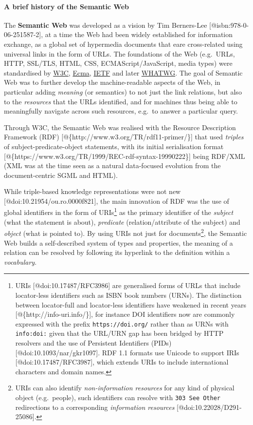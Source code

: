 \hypertarget{sec:semweb}{%
\paragraph{A brief history of the Semantic Web}\label{sec:semweb}}

The \textbf{Semantic Web} was developed as a vision by Tim Berners-Lee
{[}@isbn:978-0-06-251587-2{]}, at a time the Web had been widely
established for information exchange, as a global set of hypermedia
documents that eare cross-related using universal links in the form of
URLs. The foundations of the Web (e.g.~URLs, HTTP, SSL/TLS, HTML, CSS,
ECMAScript/JavaScript, media types) were standardised by
\href{https://www.w3.org/standards/}{W3C},
\href{https://www.ecma-international.org/}{Ecma},
\href{https://www.ietf.org/standards/}{IETF} and later
\href{https://whatwg.org/}{WHATWG}. The goal of Semantic Web was to
further develop the machine-readable aspects of the Web, in particular
adding \emph{meaning} (or semantics) to not just the link relations, but
also to the \emph{resources} that the URLs identified, and for machines
thus being able to meaningfully navigate across such resources, e.g.~to
answer a particular query.

Through W3C, the Semantic Web was realised with the Resource Description
Framework (RDF) {[}@\{http://www.w3.org/TR/rdf11-primer/\}{]} that used
\emph{triples} of subject-predicate-object statements, with its initial
serialisation format
{[}@\{https://www.w3.org/TR/1999/REC-rdf-syntax-19990222\}{]} being
RDF/XML (XML was at the time seen as a natural data-focused evolution
from the document-centric SGML and HTML).

While triple-based knowledge representations were not new
{[}@doi:10.21954/ou.ro.0000f821{]}, the main innovation of RDF was the
use of global identifiers in the form of URIs\footnote{URIs
  {[}@doi:10.17487/RFC3986{]} are generalised forms of URLs that include
  locator-less identifiers such as ISBN book numbers (URNs). The
  distinction between locator-full and locator-less identifiers have
  weakened in recent years {[}@\{http://info-uri.info/\}{]}, for
  instance DOI identifiers now are commonly expressed with the prefix
  \texttt{https://doi.org/} rather than as URNs with \texttt{info:doi:}
  given that the URL/URN gap has been bridged by HTTP resolvers and the
  use of Persistent Identifiers (PIDs) {[}@doi:10.1093/nar/gkr1097{]}.
  RDF 1.1 formats use Unicode to support IRIs
  {[}@doi:10.17487/RFC3987{]}, which extends URIs to include
  international characters and domain names.} as the primary identifier
of the \emph{subject} (what the statement is about), \emph{predicate}
(relation/attribute of the subject) and \emph{object} (what is pointed
to). By using URIs not just for documents\footnote{URIs can also
  identify \emph{non-information resources} for any kind of physical
  object (e.g.~people), such identifiers can resolve with
  \texttt{303\ See\ Other} redirections to a corresponding
  \emph{information resources} {[}@doi:10.22028/D291-25086{]}.}, the
Semantic Web builds a self-described system of types and properties, the
meaning of a relation can be resolved by following its hyperlink to the
definition within a \emph{vocabulary}.

